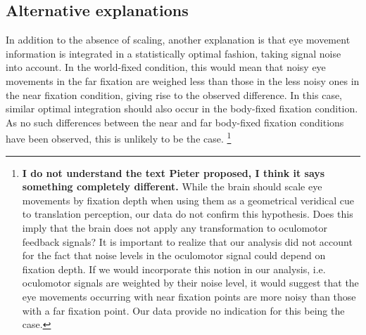 %
%






\subsection{Alternative explanations}

In addition to the absence of scaling, another explanation is that eye movement information is integrated in a statistically optimal fashion, taking signal noise into account. In the world-fixed condition, this would mean that noisy eye movements in the far fixation are weighed less than those in the less noisy ones in the near fixation condition, giving rise to the observed difference. In this case, similar optimal integration should also occur in the body-fixed fixation condition. As no such differences between the near and far body-fixed fixation conditions have been observed, this is unlikely to be the case.  \footnote{\textbf{I do not understand the text Pieter proposed, I think it says something completely different.} While the brain should scale eye movements by fixation depth when using them as a geometrical veridical cue to translation perception, our data do not confirm this hypothesis. Does this imply that the brain does not apply any transformation to oculomotor feedback signals? It is important to realize that our analysis did not account for the fact that noise levels in the oculomotor signal could depend on fixation depth. If we would incorporate this notion in our analysis, i.e.  oculomotor signals are weighted by their noise level, it would suggest that the eye movements occurring with near fixation points are more noisy than those with a far fixation point. Our data provide no indication for this being the case. }

